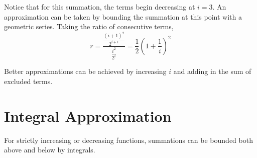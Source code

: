 \documentclass[11pt]{article}
\begin{document}
	Notice that for this summation, the terms begin decreasing at $i=3$. An approximation can be taken by bounding the summation at this point with a geometric series. Taking the ratio of consecutive terms,
	\begin{equation}
		r = \frac{\displaystyle \frac{(i+1)^2}{ 2^{i+1}}}{\displaystyle \frac{i^2}{2^i}} = \frac{1}{2} \left(1 + \frac{1}{i}\right)^2
	\end{equation}
	
	Better approximations can be achieved by increasing $i$ and adding in the sum of excluded terms.
	
\section{Integral Approximation}
	For strictly increasing or decreasing functions, summations can be bounded both above and below by integrals.
\end{document}
